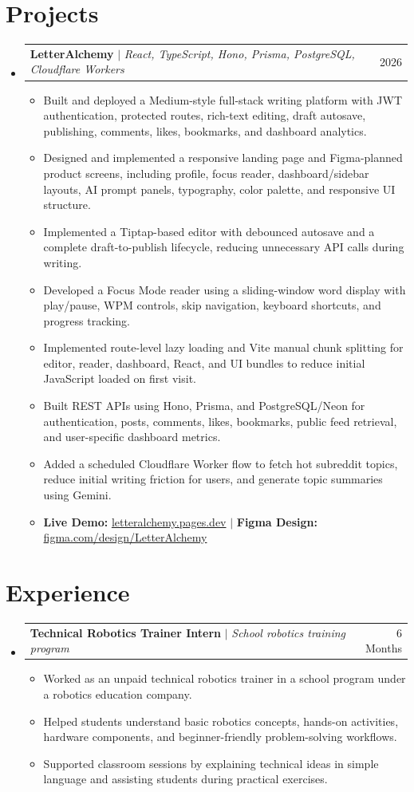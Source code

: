 \documentclass[letterpaper,11pt]{article}
\makeatletter
\newcommand{\resumeItem}[1]{
  \item\small{#1 \vspace{-2pt}}
}
\newcommand{\resumeProjectHeading}[2]{
  \item
    \begin{tabular*}{0.97\textwidth}{l@{\extracolsep{\fill}}r}
      \small#1 & #2 \\
    \end{tabular*}\vspace{-7pt}
}
\newcommand{\resumeSubHeadingListStart}{\begin{itemize}[leftmargin=0.15in, label={}]}
\newcommand{\resumeSubHeadingListEnd}{\end{itemize}}
\newcommand{\resumeItemListStart}{\begin{itemize}}
\newcommand{\resumeItemListEnd}{\end{itemize}\vspace{-5pt}}
\makeatother
\begin{document}
\section{Projects}
\resumeSubHeadingListStart

  \resumeProjectHeading
    {\textbf{LetterAlchemy} $|$ \emph{React, TypeScript, Hono, Prisma, PostgreSQL, Cloudflare Workers}}{2026}
    \resumeItemListStart
      \resumeItem{Built and deployed a Medium-style full-stack writing platform with JWT authentication, protected routes, rich-text editing, draft autosave, publishing, comments, likes, bookmarks, and dashboard analytics.}
      \resumeItem{Designed and implemented a responsive landing page and Figma-planned product screens, including profile, focus reader, dashboard/sidebar layouts, AI prompt panels, typography, color palette, and responsive UI structure.}
      \resumeItem{Implemented a Tiptap-based editor with debounced autosave and a complete draft-to-publish lifecycle, reducing unnecessary API calls during writing.}
      \resumeItem{Developed a Focus Mode reader using a sliding-window word display with play/pause, WPM controls, skip navigation, keyboard shortcuts, and progress tracking.}
      \resumeItem{Implemented route-level lazy loading and Vite manual chunk splitting for editor, reader, dashboard, React, and UI bundles to reduce initial JavaScript loaded on first visit.}
      \resumeItem{Built REST APIs using Hono, Prisma, and PostgreSQL/Neon for authentication, posts, comments, likes, bookmarks, public feed retrieval, and user-specific dashboard metrics.}
      \resumeItem{Added a scheduled Cloudflare Worker flow to fetch hot subreddit topics, reduce initial writing friction for users, and generate topic summaries using Gemini.}
      \resumeItem{\textbf{Live Demo:} \href{https://letteralchemy.pages.dev}{letteralchemy.pages.dev} $|$ \textbf{Figma Design:} \href{https://www.figma.com/design/3S7Je0iAKoSUZSfBG9BrfR/LetterAlchemy?node-id=0-1}{figma.com/design/LetterAlchemy}}
    \resumeItemListEnd

\resumeSubHeadingListEnd

\section{Experience}
\resumeSubHeadingListStart
  \resumeProjectHeading
    {\textbf{Technical Robotics Trainer Intern} $|$ \emph{School robotics training program}}{6 Months}
    \resumeItemListStart
      \resumeItem{Worked as an unpaid technical robotics trainer in a school program under a robotics education company.}
      \resumeItem{Helped students understand basic robotics concepts, hands-on activities, hardware components, and beginner-friendly problem-solving workflows.}
      \resumeItem{Supported classroom sessions by explaining technical ideas in simple language and assisting students during practical exercises.}
    \resumeItemListEnd
\resumeSubHeadingListEnd
\end{document}
